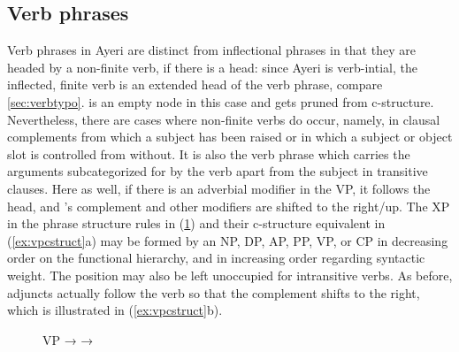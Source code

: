 
\subsection{Verb phrases}
\label{subsec:vps}

Verb phrases in Ayeri are distinct from inflectional phrases in that they are
headed by a non-finite verb, if there is a head: since Ayeri is verb-intial,
the inflected, finite verb is an extended head of the verb phrase, compare
\autoref{sec:verbtypo}.  is an empty node in this case and gets
pruned from c-structure. Nevertheless, there are cases where non-finite verbs
do occur, namely, in clausal complements from which a subject has been raised
or in which a subject or object slot is controlled from without. It is also the
verb phrase which carries the arguments subcategorized for by the verb apart
from the subject in transitive clauses. Here as well, if there is an adverbial
modifier in the VP, it follows the head, and 's complement and other
modifiers are shifted to the right/up. The XP in the phrase structure rules in
(\ref{ex:vppstruct}) and their c-structure equivalent in (\ref{ex:vpcstruct}a)
may be formed by an NP, DP, AP, PP, VP, or CP in decreasing order on the
functional hierarchy, and in increasing order regarding syntactic weight. The
position may also be left unoccupied for intransitive verbs. As before,
adjuncts actually follow the verb so that the complement shifts to the right,
which is illustrated in (\ref{ex:vpcstruct}b).

\begin{figure}
\pex\label{ex:vppstruct}
\a VP →  
\a {} →  
\xe
\end{figure}

